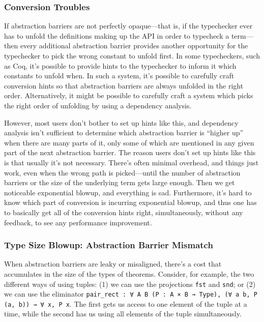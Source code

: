 \subsubsection{Conversion Troubles}
If abstraction barriers are not perfectly opaque---that is, if the typechecker ever has to unfold the definitions making up the API in order to typecheck a term---then every additional abstraction barrier provides another opportunity for the typechecker to pick the wrong constant to unfold first.
In some typecheckers, such as Coq, it's possible to provide hints to the typechecker to inform it which constants to unfold when.
In such a system, it's possible to carefully craft conversion hints so that abstraction barriers are always unfolded in the right order.
Alternatively, it might be possible to carefully craft a system which picks the right order of unfolding by using a dependency analysis.

However, most users don't bother to set up hints like this, and dependency analysis isn't sufficient to determine which abstraction barrier is ``higher up'' when there are many parts of it, only some of which are mentioned in any given part of the next abstraction barrier.
The reason users don't set up hints like this is that usually it's not necessary.
There's often minimal overhead, and things just work, even when the wrong path is picked---until the number of abstraction barriers or the size of the underlying term gets large enough.
Then we get noticeable exponential blowup, and everything is sad.
Furthermore, it's hard to know which part of conversion is incurring exponential blowup, and thus one has to basically get all of the conversion hints right, simultaneously, without any feedback, to see any performance improvement.



\subsubsection{Type Size Blowup: Abstraction Barrier Mismatch}
When abstraction barriers are leaky or misaligned, there's a cost that accumulates in the size of the types of theorems.
Consider, for example, the two different ways of using tuples:
(1) we can use the projections \texttt{fst} and \texttt{snd}; or
(2) we can use the eliminator \texttt{pair_rect : ∀ A B (P : A × B → Type), (∀ a b, P (a, b)) → ∀ x, P x}.
The first gets us access to one element of the tuple at a time, while the second has us using all elements of the tuple simultaneously.

